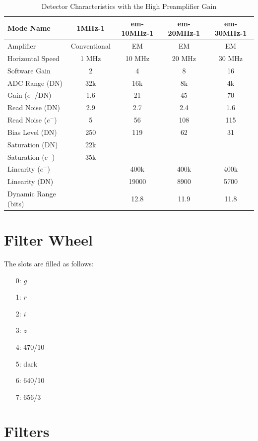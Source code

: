 \begin{table}
    \centering
    \begin{tabular}{lcccc}
    \hline
    Mode Name&1MHz-1&em-10MHz-1&em-20MHz-1&em-30MHz-1\\
    \hline
    Amplifier&Conventional&EM&EM&EM\\
    Horizontal Speed&1 MHz&10 MHz&20 MHz&30 MHz\\
    Software Gain&2&4&8&16\\
    ADC Range (DN)&32k&16k&8k&4k\\
    Gain ($e^-$/DN)&1.6&21&45&70\phantom{0}\\
    Read Noise (DN)&2.9&2.7&2.4&1.6\\
    Read Noise ($e^-$)&5&56&108&115\\
    Bias Level (DN)&250&119&62&31\\
    Saturation (DN)&22k&\\
    Saturation ($e^-$)&35k&\\
    Linearity ($e^-$)&&400k&400k&400k\\
    Linearity (DN)&&19000&8900&5700\\
    Dynamic Range (bits)&&12.8&11.9&11.8\\
    \hline
    \end{tabular}
    \caption{Detector Characteristics with the High Preamplifier Gain}
    \label{table:huitzi-f8-detector-characteristics-high-gain}
\end{table}

\section{Filter Wheel}

The slots are filled as follows:
    \begin{enumerate}
        \item[0:] $g$
        \item[1:] $r$
        \item[2:] $i$
        \item[3:] $z$
        \item[4:] 470/10
        \item[5:] dark
        \item[6:] 640/10
        \item[7:] 656/3
    \end{enumerate}
    
\section{Filters}


